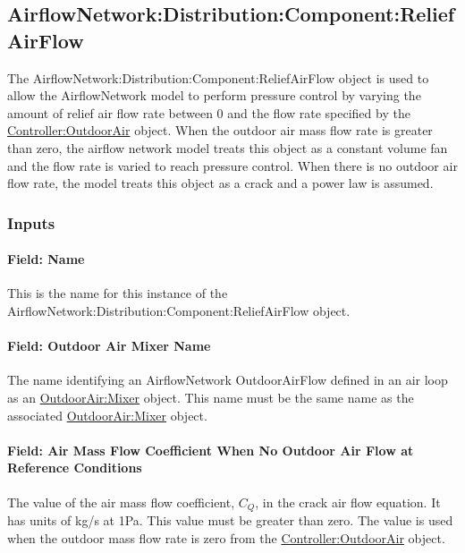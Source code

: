 \subsection{AirflowNetwork:Distribution:Component:ReliefAirFlow}\label{airflowNetworkdistributioncomponentreliefairflow}

The AirflowNetwork:Distribution:Component:ReliefAirFlow object is used to allow the AirflowNetwork model to perform pressure control by varying the amount of relief air flow rate between 0 and the flow rate specified by the \hyperref[controlleroutdoorair]{Controller:OutdoorAir} object. When the outdoor air mass flow rate is greater than zero, the airflow network model treats this object as a constant volume fan and the flow rate is varied to reach pressure control. When there is no outdoor air flow rate, the model treats this object as a crack and a power law is assumed.

\subsubsection{Inputs}\label{inputs-AFN-reliefairflow}

\paragraph{Field: Name}\label{field-name-reliefairflow}

This is the name for this instance of the AirflowNetwork:Distribution:Component:ReliefAirFlow object.

\paragraph{Field: Outdoor Air Mixer Name}\label{field-name-outdoor-air-mixer}

The name identifying an AirflowNetwork OutdoorAirFlow defined in an air loop as an \hyperref[outdoorairmixer]{OutdoorAir:Mixer} object. This name must be the same name as the associated \hyperref[outdoorairmixer]{OutdoorAir:Mixer} object.

\paragraph{Field: Air Mass Flow Coefficient When No Outdoor Air Flow at Reference Conditions}\label{field-air-mass-flow-coefficient-when-no-outdoor-air-flow-at-reference-conditions-2016-06-16}

The value of the air mass flow coefficient, \({C_Q}\), in the crack air flow equation. It has units of kg/s at 1Pa. This value must be greater than zero. The value is used when the outdoor mass flow rate is zero from the \hyperref[controlleroutdoorair]{Controller:OutdoorAir} object.


